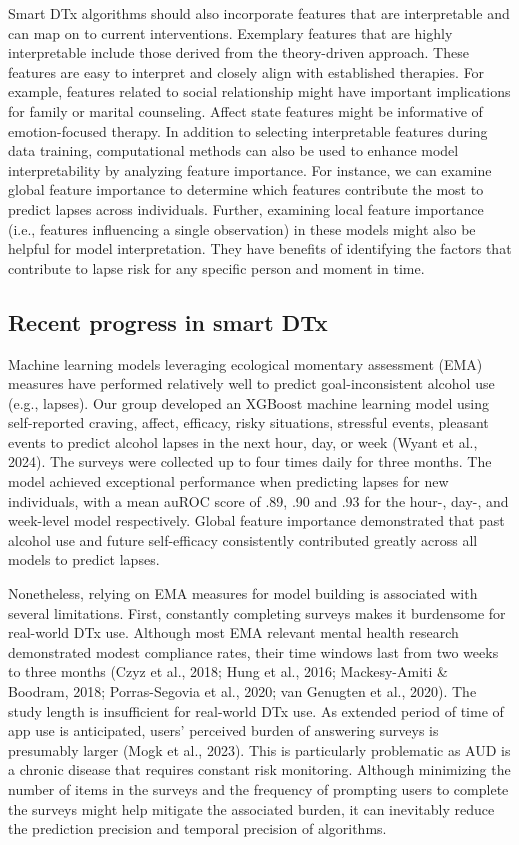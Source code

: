 \documentclass[
  letterpaper,
  DIV=11,
  numbers=noendperiod]{scrartcl}
\begin{document}
Smart DTx algorithms should also incorporate features that are
interpretable and can map on to current interventions. Exemplary
features that are highly interpretable include those derived from the
theory-driven approach. These features are easy to interpret and closely
align with established therapies. For example, features related to
social relationship might have important implications for family or
marital counseling. Affect state features might be informative of
emotion-focused therapy. In addition to selecting interpretable features
during data training, computational methods can also be used to enhance
model interpretability by analyzing feature importance. For instance, we
can examine global feature importance to determine which features
contribute the most to predict lapses across individuals. Further,
examining local feature importance (i.e., features influencing a single
observation) in these models might also be helpful for model
interpretation. They have benefits of identifying the factors that
contribute to lapse risk for any specific person and moment in time.

\subsection{Recent progress in smart
DTx}\label{recent-progress-in-smart-dtx}

Machine learning models leveraging ecological momentary assessment (EMA)
measures have performed relatively well to predict goal-inconsistent
alcohol use (e.g., lapses). Our group developed an XGBoost machine
learning model using self-reported craving, affect, efficacy, risky
situations, stressful events, pleasant events to predict alcohol lapses
in the next hour, day, or week (Wyant et al., 2024). The surveys were
collected up to four times daily for three months. The model achieved
exceptional performance when predicting lapses for new individuals, with
a mean auROC score of .89, .90 and .93 for the hour-, day-, and
week-level model respectively. Global feature importance demonstrated
that past alcohol use and future self-efficacy consistently contributed
greatly across all models to predict lapses.

Nonetheless, relying on EMA measures for model building is associated
with several limitations. First, constantly completing surveys makes it
burdensome for real-world DTx use. Although most EMA relevant mental
health research demonstrated modest compliance rates, their time windows
last from two weeks to three months (Czyz et al., 2018; Hung et al.,
2016; Mackesy-Amiti \& Boodram, 2018; Porras-Segovia et al., 2020; van
Genugten et al., 2020). The study length is insufficient for real-world
DTx use. As extended period of time of app use is anticipated, users'
perceived burden of answering surveys is presumably larger (Mogk et al.,
2023). This is particularly problematic as AUD is a chronic disease that
requires constant risk monitoring. Although minimizing the number of
items in the surveys and the frequency of prompting users to complete
the surveys might help mitigate the associated burden, it can inevitably
reduce the prediction precision and temporal precision of algorithms.
\end{document}
